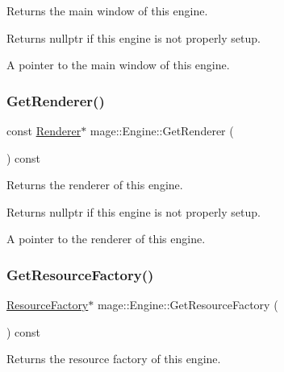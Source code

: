Returns the main window of this engine.

\begin{DoxyReturn}{Returns}
{\ttfamily nullptr} if this engine is not properly setup. 

A pointer to the main window of this engine. 
\end{DoxyReturn}
\hypertarget{classmage_1_1_engine_a91f77d4f1914e1d63d405444a590615b}{}\label{classmage_1_1_engine_a91f77d4f1914e1d63d405444a590615b} 
\subsubsection{\texorpdfstring{Get\+Renderer()}{GetRenderer()}}
{\footnotesize\ttfamily const \hyperlink{classmage_1_1_renderer}{Renderer}$\ast$ mage\+::\+Engine\+::\+Get\+Renderer (\begin{DoxyParamCaption}{ }\end{DoxyParamCaption}) const\hspace{0.3cm}{\ttfamily [noexcept]}}

Returns the renderer of this engine.

\begin{DoxyReturn}{Returns}
{\ttfamily nullptr} if this engine is not properly setup. 

A pointer to the renderer of this engine. 
\end{DoxyReturn}
\hypertarget{classmage_1_1_engine_a891f26e1a3e9a0113b9c4d337c82a04e}{}\label{classmage_1_1_engine_a891f26e1a3e9a0113b9c4d337c82a04e} 
\subsubsection{\texorpdfstring{Get\+Resource\+Factory()}{GetResourceFactory()}}
{\footnotesize\ttfamily \hyperlink{classmage_1_1_resource_factory}{Resource\+Factory}$\ast$ mage\+::\+Engine\+::\+Get\+Resource\+Factory (\begin{DoxyParamCaption}{ }\end{DoxyParamCaption}) const\hspace{0.3cm}{\ttfamily [noexcept]}}

Returns the resource factory of this engine.


